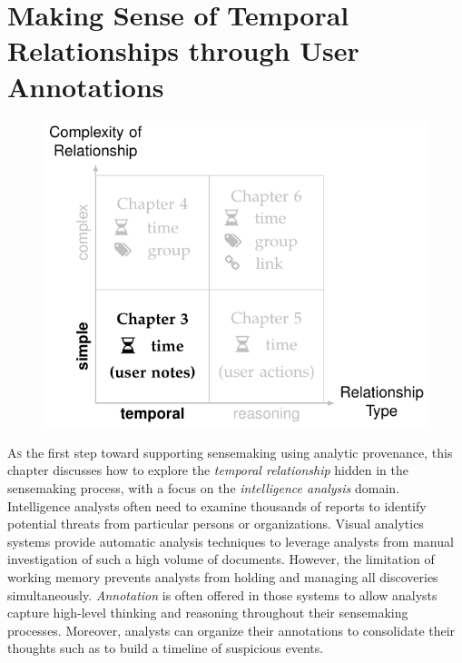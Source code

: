 \chapter{Making Sense of Temporal Relationships through User Annotations}
\label{chap:schemaline}

\graphicspath{{Chapter3/figures/}}

\begin{figure}[!h]
	\centering
	\includegraphics{work}
\end{figure}

\vspace{.8in}


\pagebreak
\lettrine{A}{s} the first step toward supporting sensemaking using analytic provenance, this chapter discusses how to explore the \emph{temporal relationship} hidden in the sensemaking process, with a focus on the \emph{intelligence analysis} domain. Intelligence analysts often need to examine thousands of reports to identify potential threats from particular persons or organizations. Visual analytics systems provide automatic analysis techniques to leverage analysts from manual investigation of such a high volume of documents. However, the limitation of working memory prevents analysts from holding and managing all discoveries simultaneously. \emph{Annotation} is often offered in those systems to allow analysts capture high-level thinking and reasoning throughout their sensemaking processes. Moreover, analysts can organize their annotations to consolidate their thoughts such as to build a timeline of suspicious events.

